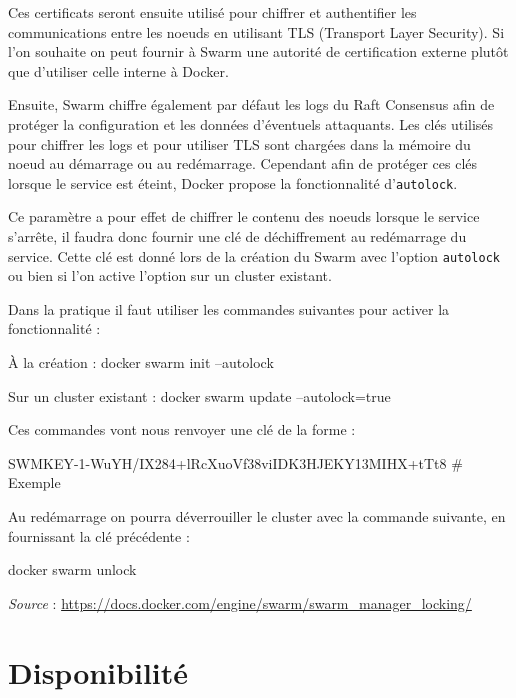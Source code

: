 Ces certificats seront ensuite utilisé pour chiffrer et authentifier les communications
entre les noeuds en utilisant TLS (Transport Layer Security). Si l'on souhaite on peut
fournir à Swarm une autorité de certification externe plutôt que d'utiliser celle interne
à Docker.\newline

Ensuite, Swarm chiffre également par défaut les logs du Raft Consensus afin de protéger
la configuration et les données d'éventuels attaquants. Les clés utilisés pour chiffrer les
logs et pour utiliser TLS sont chargées dans la mémoire du noeud au démarrage ou au
redémarrage. Cependant afin de protéger ces clés lorsque le service est éteint, Docker propose
la fonctionnalité d'\verb:autolock:.

Ce paramètre a pour effet de chiffrer le contenu des noeuds lorsque le service s'arrête, il
faudra donc fournir une clé de déchiffrement au redémarrage du service. Cette clé est donné lors
de la création du Swarm avec l'option \verb:autolock: ou bien si l'on active l'option sur un
cluster existant.\newline

Dans la pratique il faut utiliser les commandes suivantes pour activer la fonctionnalité :

\begin{bashWithTitle}{À la création :}
docker swarm init --autolock
\end{bashWithTitle}

\begin{bashWithTitle}{Sur un cluster existant :}
docker swarm update --autolock=true
\end{bashWithTitle}
\newpage

Ces commandes vont nous renvoyer une clé de la forme :
\begin{bash}
SWMKEY-1-WuYH/IX284+lRcXuoVf38viIDK3HJEKY13MIHX+tTt8    # Exemple
\end{bash}

Au redémarrage on pourra déverrouiller le cluster avec la commande suivante, en fournissant la clé
précédente :
\begin{bash}
docker swarm unlock
\end{bash}

\emph{Source} : \href{https://docs.docker.com/engine/swarm/swarm\_manager\_locking/}{https://docs.docker.com/engine/swarm/swarm\_manager\_locking/}

\section{Disponibilité}

